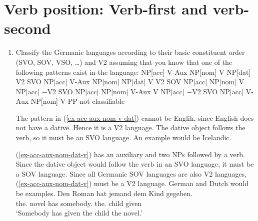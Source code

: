 \section{Verb position: Verb-first and verb-second}



\begin{enumerate}
\item Classify the Germanic languages according to their basic constituent order (SVO, SOV, VSO,
  \ldots) and V2 assuming that you know that one of the following patterns exist in the language:
\eal
\label{ex-v2-task-solution}
\ex 
\label{ex-acc-aux-nom-v-dat}
NP[acc] V-Aux NP[nom] V NP[dat]   \hfill  V2 SVO 
\ex
\label{ex-acc-aux-nom-dat-v} 
NP[acc] V-Aux NP[nom] NP[dat] V   \hfill  V2 SOV
\ex 
\label{ex-acc-nom-v-acc}
NP[acc] NP[nom] V NP[acc]         \hfill $-$V2 SVO
\ex 
\label{ex-acc-nom-aux-v-acc}
NP[acc] NP[nom] V-Aux V NP[acc]   \hfill $-$V2 SVO
\ex 
\label{ex-acc-aux-nom-v-pp}
NP[acc] V-Aux NP[nom] V PP        \hfill not classifiable
\zl

The pattern in (\ref{ex-acc-aux-nom-v-dat}) cannot be Englih, since English does not have a dative. Hence it is a V2
language. The dative object follows the verb, so it must be an SVO language. An example would be Icelandic.
\ea

\z

(\ref{ex-acc-aux-nom-dat-v}) has an auxiliary and two NPs followed by a verb. Since the dative object would follow the verb
in an SVO language, it must be a SOV language. Since all Germanic SOV languages are also V2
languages, (\ref{ex-acc-aux-nom-dat-v}) must be a V2 language. German and Dutch would be examples.
\ea
\gll Den Roman hat jemand dem Kind gegeben.\\
     the.\ACC{} novel has somebody.\NOM{} the.\DAT{} child given\\
\glt `Somebody has given the child the novel.'
\z


\end{enumerate}
